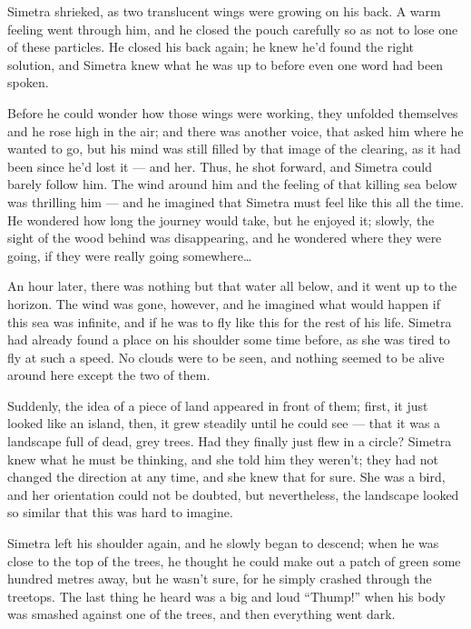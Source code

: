Simetra shrieked, as two translucent wings were growing on his back. 
A warm feeling went through him, and he closed the pouch carefully so as not to lose one of these particles. He closed his back again; he knew he'd found the right solution, and Simetra knew what he was up to before even one word had been spoken. 

Before he could wonder how those wings were working, they unfolded themselves and he rose high in the air; and there was another voice, that asked him where he wanted to go, but his mind was still filled by that image of the clearing, as it had been since he'd lost it --- and her.
Thus, he shot forward, and Simetra could barely follow him. The wind around him and the feeling of that killing sea below was thrilling him --- and he imagined that Simetra must feel like this all the time. He wondered how long the journey would take, but he enjoyed it; slowly, the sight of the wood behind was disappearing, and he wondered where they were going, if they were really going somewhere\dots

An hour later, there was nothing but that water all below, and it went up to the horizon. The wind was gone, however, and he imagined what would happen if this sea was infinite, and if he was to fly like this for the rest of his life. Simetra had already found a place on his shoulder some time before, as she was tired to fly at such a speed. No clouds were to be seen, and nothing seemed to be alive around here except the two of them.

Suddenly, the idea of a piece of land appeared in front of them; first, it just looked like an island, then, it grew steadily until he could see --- that it was a landscape full of dead, grey trees. Had they finally just flew in a circle? Simetra knew what he must be thinking, and she told him they weren't; they had not changed the direction at any time, and she knew that for sure. She was a bird, and her orientation could not be doubted, but nevertheless, the landscape looked so similar that this was hard to imagine.

Simetra left his shoulder again, and he slowly began to descend; when he was close to the top of the trees, he thought he could make out a patch of green some hundred metres away, but he wasn't sure, for he simply crashed through the treetops. The last thing he heard was a big and loud \enquote{Thump!} when his body was smashed against one of the trees, and then everything went dark. 

